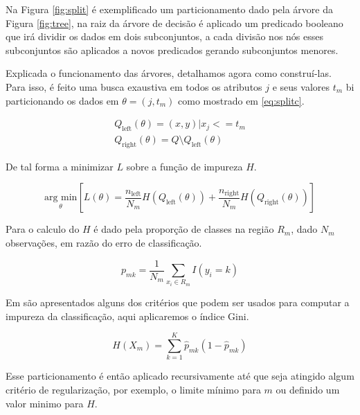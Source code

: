 Na Figura \ref{fig:split} é exemplificado um particionamento dado pela árvore
da Figura \ref{fig:tree}, na raiz da árvore de decisão é aplicado um predicado
booleano que irá dividir os dados em dois subconjuntos, a cada divisão nos nós
esses subconjuntos são aplicados a novos predicados gerando subconjuntos
menores.

Explicada o funcionamento das árvores, detalhamos agora como construí-las. Para
isso, é feito uma busca exaustiva em todos os atributos $j$ e seus valores
$t_m$ bi particionando os dados em $\theta = (j,t_m)$ como mostrado em
\ref{eq:splitc}.

\begin{equation}
        \begin{aligned}
            Q_{\text{left}}(\theta) = {(x, y) | x_j <= t_m}\\
            Q_{\text{right}}(\theta) = Q \setminus Q_{\text{left}}(\theta)
        \end{aligned}
    \label{eq:splitc}
\end{equation}

De tal forma a minimizar $L$ sobre a função de
impureza $H$.

\begin{equation}
    \underset{\theta}{\text{arg min}} \left[ L(\theta) =  \frac{n_{\text{left}}}{N_m} H(Q_{\text{left}}(\theta)) +
    \frac{n_{\text{right}}}{N_m} H(Q_{\text{right}}(\theta)) \right]
    \label{eq:treegreed}
\end{equation}

Para o calculo do $H$ é dado pela proporção de classes na região $R_m$,
dado $N_m$ observações, em razão do erro de classificação.

\begin{equation}
    p_{mk} = \frac{1}{N_m} \sum_{x_i \in R_m} I(y_i = k)
\end{equation}

Em \cite{friedman2001elements} são apresentados alguns dos critérios que podem
ser usados para computar a impureza da classificação, aqui aplicaremos o índice
Gini.

\begin{equation}
    H(X_m) = \sum_{k=1}^{K} \hat{p}_{mk}(1 - \hat{p}_{mk})
    \label{eq:gini}
\end{equation}

Esse particionamento é então aplicado recursivamente até que seja atingido
algum critério de regularização, por exemplo, o limite mínimo para $m$ ou
definido um valor minimo para $H$.


